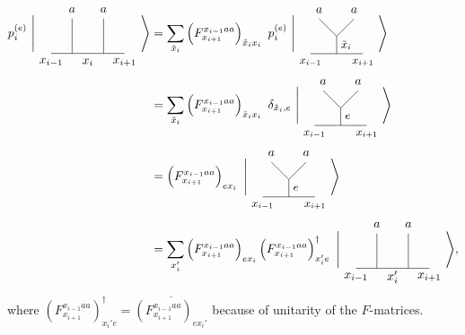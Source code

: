 	\begin{align}
		p_i^{(e)}\ \Bigg|
		\begin{tikzpicture}[baseline=(current bounding box.center)]
			\draw (0,0) -- (2.1,0);
			\draw (0.6,0) -- (0.6,1);
			\draw (1.5,0) -- (1.5,1);
			\node at (0,-0.25) {$x_{i-1}$};
			\node at (2.1,-0.25) {$x_{i+1}$};
			\node at (1.05,-0.25) {$x_{i}$};
			\node at (0.6,1.25) {$a$};
			\node at (1.5,1.25) {$a$};
		\end{tikzpicture}\Bigg\rangle&=\sum_{\tilde{x}_i}\left(F_{x_{i+1}}^{x_{i-1}aa}\right)_{\tilde{x}_ix_i}\ p_i^{(e)}\ \Bigg|
		\begin{tikzpicture}[baseline=(current bounding box.center)]
			\draw (0.25,0) -- (1.75,0);
			\draw (1,0) to node[right] {\small $\tilde{x}_i$} (1,0.5);
			\draw (1,0.5) -- (0.5,1);
			\draw (1,0.5) -- (1.5,1);
			\node at (0.25,-0.25) {\small $x_{i-1}$};
			\node at (1.75,-0.25) {\small $x_{i+1}$};
			\node at (0.5,1.25) {$a$};
			\node at (1.5,1.25) {$a$};
		\end{tikzpicture}\Bigg\rangle\\
		&=\sum_{\tilde{x}_i}\left(F_{x_{i+1}}^{x_{i-1}aa}\right)_{\tilde{x}_ix_i}\ \delta_{\tilde{x}_i,e}\ \Bigg|
		\begin{tikzpicture}[baseline=(current bounding box.center)]
			\draw (0.25,0) -- (1.75,0);
			\draw (1,0) to node[right] {\small $e$} (1,0.5);
			\draw (1,0.5) -- (0.5,1);
			\draw (1,0.5) -- (1.5,1);
			\node at (0.25,-0.25) {\small $x_{i-1}$};
			\node at (1.75,-0.25) {\small $x_{i+1}$};
			\node at (0.5,1.25) {$a$};
			\node at (1.5,1.25) {$a$};
		\end{tikzpicture}\Bigg\rangle\\
		&=\left(F_{x_{i+1}}^{x_{i-1}aa}\right)_{ex_i}\ \Bigg|
		\begin{tikzpicture}[baseline=(current bounding box.center)]
			\draw (0.25,0) -- (1.75,0);
			\draw (1,0) to node[right] {\small $e$} (1,0.5);
			\draw (1,0.5) -- (0.5,1);
			\draw (1,0.5) -- (1.5,1);
			\node at (0.25,-0.25) {\small $x_{i-1}$};
			\node at (1.75,-0.25) {\small $x_{i+1}$};
			\node at (0.5,1.25) {$a$};
			\node at (1.5,1.25) {$a$};
		\end{tikzpicture}\Bigg\rangle\\
		&=\sum_{x_i'}\left(F_{x_{i+1}}^{x_{i-1}aa}\right)_{ex_i}\left(F_{x_{i+1}}^{x_{i-1}aa}\right)^\dagger_{x_i'e}\ \Bigg|
		\begin{tikzpicture}[baseline=(current bounding box.center)]
			\draw (0,0) -- (2.1,0);
			\draw (0.6,0) -- (0.6,1);
			\draw (1.5,0) -- (1.5,1);
			\node at (0,-0.25) {$x_{i-1}$};
			\node at (2.1,-0.25) {$x_{i+1}$};
			\node at (1.05,-0.25) {$x_i'$};
			\node at (0.6,1.25) {$a$};
			\node at (1.5,1.25) {$a$};
		\end{tikzpicture}\Bigg\rangle,
	\end{align}
where $\left(F_{x_{i+1}}^{x_{i-1}aa}\right)^\dagger_{x_i'e}=\overline{\left(F_{x_{i+1}}^{x_{i-1}aa}\right)_{ex_i'}}$ because of unitarity of the $F$-matrices.

